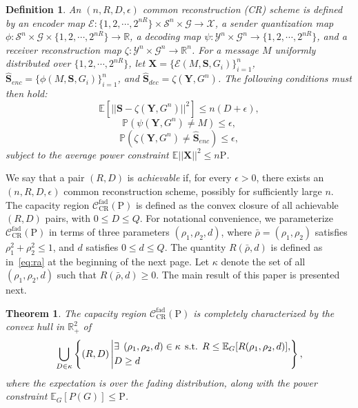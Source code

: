 \documentclass[journal]{IEEEtran}
\def\eE{\mathbb E}
\def\bhcY{\mathcal{Y}^n}
\def\bhcS{\mathcal{S}^n}
\def\sCapa{\mathcal C_{\text{est}}^{\text{fad}}(\mathrm{P})}
\newtheorem{theorem}{Theorem}%
\newtheorem{defn}{Definition}
\def\eE{\mathbb E}
\def\bS{\mathbf S}
\def\bY{\mathbf Y}
\def\bhS{\hat{\mathbf S}}
\def\bhS{\hat{\mathbf S}}
\def\bX{\mathbf X}
\def\bhcY{\mathcal{Y}^n}
\def\bhcS{\mathcal{S}^n}
\def\sCapa{\mathcal C_{\text{CR}}^{\text{fad}}(\mathrm{P})}
\begin{document}
\begin{defn}
An $(n,R,D,\epsilon)$ common reconstruction (CR) scheme is defined by an encoder map $\mathcal{E}:\{1,2,\cdots,2^{nR}\} \times \bhcS \times \mathcal{G} \to \mathcal{X}$, a sender quantization map $\phi:\bhcS \times \mathcal{G} \times \{1,2,\cdots,2^{nR}\} \to \mathbb R$, a decoding map $\psi:\bhcY \times \mathcal{G}^n \to \{1,2,\cdots, 2^{nR}\}$, and a receiver reconstruction map $\zeta: \bhcY \times \mathcal{G}^n \to \mathbb R^n$. For a message $M$ uniformly distributed over $\{1,2,\cdots,2^{nR}\}$, let $\bX=\{\mathcal{E}(M,\bS, G_i)\}_{i=1}^n$, $\bhS_{enc}=\{\phi(M,\bS,G_i)\}_{i=1}^n$, and $\bhS_{dec}=\zeta(\bY,G^n)$. The following conditions must then hold:
\begin{equation}
\eE{[||\bS-\zeta(\bY,G^n)||^2]} \leq n(D+\epsilon),
\end{equation}
\begin{equation}
\mathbb{P}(\psi(\bY,G^n) \neq M) \leq \epsilon,
\end{equation}
\begin{equation}
\mathbb{P}\left(\zeta(\bY,G^n) \neq \bhS_{enc} \right) \leq \epsilon,
\end{equation}
subject to the average power constraint $\eE ||\bX||^{2} \leq n\mathrm{P}$. 
\end{defn}

We say that a pair $(R,D)$ is \emph{achievable} if, for every $\epsilon > 0$, there exists an $(n,R,D,\epsilon)$ common reconstruction scheme, possibly for sufficiently large $n$. The capacity region $\sCapa$ is defined as the convex closure of all achievable $(R,D)$ pairs, with $0 \leq D \leq Q$. For notational convenience, we parameterize $\sCapa$ in terms of three parameters $(\rho_1,\rho_2,d)$, where $\bar{\rho} = (\rho_1, \rho_2)$ satisfies $\rho_1^2 + \rho_2^2 \leq 1$, and $d$ satisfies $0 \leq d \leq Q$. The quantity $R(\bar{\rho}, d)$ is defined as in~\eqref{eq:ra} at the beginning of the next page. Let $\kappa$ denote the set of all $(\rho_1, \rho_2, d)$ such that $R(\bar{\rho}, d) \geq 0$. %
The main result of this paper is presented next.

\begin{theorem} \label{thm:mainN}
The capacity region $\sCapa$ is completely characterized by the convex hull in $\mathbb R_+^2$ of 
\begin{align*}
\underset{D \in \kappa}{\bigcup} \left\{ \left( R, D \right)\Bigg\vert \begin{aligned} &\exists \:\: (\rho_1,\rho_2,{d}) \in \kappa \:\: \textup{s.t.}\:\: R \leq \eE_{G}[ R(\rho_1,\rho_2, d)],\\
& D \geq d \end{aligned}   \right\},
\end{align*}
where the expectation is over the fading distribution, along with the power constraint $\mathbb{E}_{G}[P(G)] \leq \mathrm{P}$.
\end{theorem}
\end{document}

